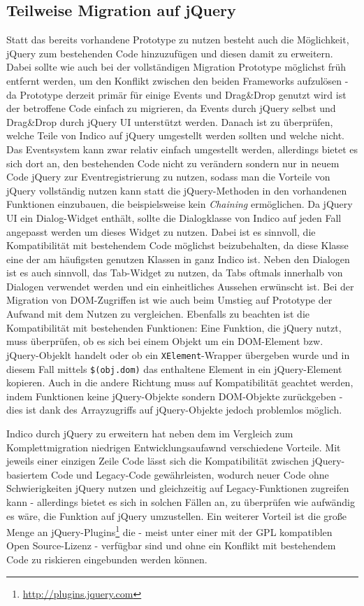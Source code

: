 \subsection{Teilweise Migration auf jQuery}
Statt das bereits vorhandene Prototype zu nutzen besteht auch die Möglichkeit, jQuery zum
bestehenden Code hinzuzufügen und diesen damit zu erweitern. Dabei sollte wie auch bei der
vollständigen Migration Prototype möglichst früh entfernt werden, um den Konflikt zwischen den
beiden Frameworks aufzulösen - da Prototype derzeit primär für einige Events und Drag\&Drop genutzt
wird ist der betroffene Code einfach zu migrieren, da Events durch jQuery selbst und Drag\&Drop
durch jQuery UI unterstützt werden. Danach ist zu überprüfen, welche Teile von Indico auf jQuery
umgestellt werden sollten und welche nicht. Das Eventsystem kann zwar relativ einfach umgestellt
werden, allerdings bietet es sich dort an, den bestehenden Code nicht zu verändern sondern nur in
neuem Code jQuery zur Eventregistrierung zu nutzen, sodass man die Vorteile von jQuery vollständig
nutzen kann statt die jQuery-Methoden in den vorhandenen Funktionen einzubauen, die beispielsweise
kein \emph{Chaining} ermöglichen. Da jQuery UI ein Dialog-Widget enthält, sollte die Dialogklasse von
Indico auf jeden Fall angepasst werden um dieses Widget zu nutzen. Dabei ist es sinnvoll, die
Kompatibilität mit bestehendem Code möglichst beizubehalten, da diese Klasse eine der am häufigsten
genutzen Klassen in ganz Indico ist. Neben den Dialogen ist es auch sinnvoll, das Tab-Widget zu
nutzen, da Tabs oftmals innerhalb von Dialogen verwendet werden und ein einheitliches Aussehen
erwünscht ist. Bei der Migration von DOM-Zugriffen ist wie auch beim Umstieg auf Prototype der
Aufwand mit dem Nutzen zu vergleichen. Ebenfalls zu beachten ist die Kompatibilität mit bestehenden
Funktionen: Eine Funktion, die jQuery nutzt, muss überprüfen, ob es sich bei einem Objekt um ein
DOM-Element bzw. jQuery-Objeklt handelt oder ob ein \lstinline{XElement}-Wrapper übergeben wurde und
in diesem Fall mittels \lstinline{$(obj.dom)} das enthaltene Element in ein jQuery-Element
kopieren. Auch in die andere Richtung muss auf Kompatibilität geachtet werden, indem Funktionen keine
jQuery-Objekte sondern DOM-Objekte zurückgeben - dies ist dank des Arrayzugriffs auf jQuery-Objekte
jedoch problemlos möglich.

Indico durch jQuery zu erweitern hat neben dem im Vergleich zum Komplettmigration niedrigen
Entwicklungsaufawnd verschiedene Vorteile. Mit jeweils einer einzigen Zeile Code lässt sich die
Kompatibilität zwischen jQuery-basiertem Code und Legacy-Code gewährleisten, wodurch neuer Code ohne
Schwierigkeiten jQuery nutzen und gleichzeitig auf Legacy-Funktionen zugreifen kann - allerdings
bietet es sich in solchen Fällen an, zu überprüfen wie aufwändig es wäre, die Funktion auf jQuery
umzustellen. Ein weiterer Vorteil ist die große Menge an
jQuery-Plugins\footnote{\href{http://plugins.jquery.com}{http://plugins.jquery.com}} die - meist
unter einer mit der GPL kompatiblen Open Source-Lizenz - verfügbar sind und ohne ein Konflikt mit
bestehendem Code zu riskieren eingebunden werden können.



